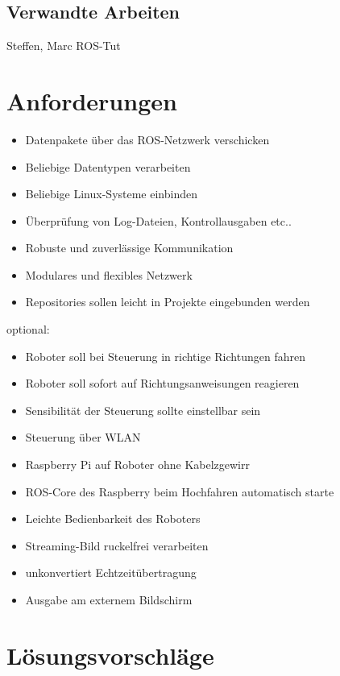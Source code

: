 \documentclass[12pt]{article}
\begin{document}
\subsection{Verwandte Arbeiten}

Steffen, Marc
ROS-Tut

\section{Anforderungen}

\begin{itemize}
\item Datenpakete über das ROS-Netzwerk verschicken
\item Beliebige Datentypen verarbeiten
\item Beliebige Linux-Systeme einbinden
\item Überprüfung von Log-Dateien, Kontrollausgaben etc..
\item Robuste und zuverlässige Kommunikation
\item Modulares und flexibles Netzwerk
\item Repositories sollen leicht in Projekte eingebunden werden
\end{itemize}

optional:

\begin{itemize}
\item Roboter soll bei Steuerung in richtige Richtungen fahren
\item Roboter soll sofort auf Richtungsanweisungen reagieren
\item Sensibilität der Steuerung sollte einstellbar sein
\item Steuerung über WLAN
\item Raspberry Pi auf Roboter ohne Kabelzgewirr %
\item ROS-Core des Raspberry beim Hochfahren automatisch starte
\item Leichte Bedienbarkeit des Roboters

\vspace{0,6cm}

\item Streaming-Bild ruckelfrei verarbeiten
\item unkonvertiert Echtzeitübertragung
\item Ausgabe am externem Bildschirm
\end{itemize}


\section{Lösungsvorschläge}
\end{document}
